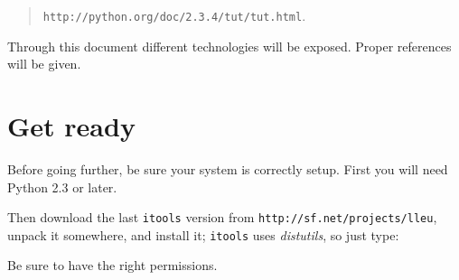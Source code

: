 \begin{quote}
  {\tt http://python.org/doc/2.3.4/tut/tut.html}.
\end{quote}

Through this document different technologies will be exposed. Proper
references will be given.

\section{Get ready}

Before going further, be sure your system is correctly setup. First you
will need Python 2.3 or later.

Then download the last {\tt itools} version from
{\tt http://sf.net/projects/lleu}, unpack it somewhere, and install it;
{\tt itools} uses {\em distutils}, so just type:


Be sure to have the right permissions.


